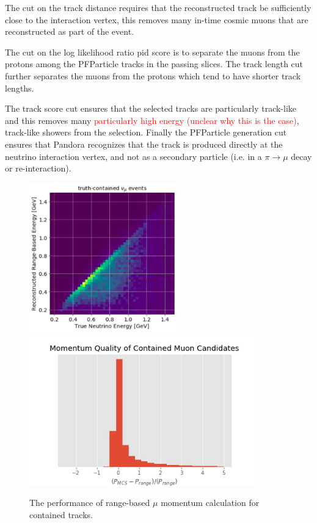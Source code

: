 \par The cut on the track distance requires that the reconstructed track be sufficiently close to the interaction vertex, this removes many in-time cosmic muons that are reconstructed as part of the event.

\par The cut on the log likelihood ratio pid score is to separate the muons from the protons among the PFParticle tracks in the passing slices. The track length cut further separates the muons from the protons which tend to have shorter track lengths. 

\par The track score cut ensures that the selected tracks are particularly track-like and this removes many \textcolor{red}{particularly high energy (unclear why this is the case)}, track-like showers from the selection. Finally the PFParticle generation cut ensures that Pandora recognizes that the track is produced directly at the neutrino interaction vertex, and not as a secondary particle (i.e. in a $\pi \rightarrow \mu$ decay or re-interaction). 

\begin{figure}
    \centering
    \includegraphics[height=6.5cm]{NuMuCCsel/Images/Ryan/containedMomentumRes.png} \hspace{2mm}
    \includegraphics[height=6.5cm]{NuMuCCsel/Images/Ryan/muoncandidate_pquality.jpg} \hspace{2mm}
    \caption{The performance of range-based $\mu$ momentum calculation for contained tracks.}
    \label{fig:numusel:momres}
\end{figure}

